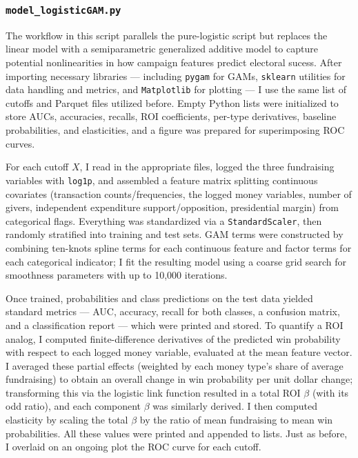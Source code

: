 \subsubsection*{\tt model\_logisticGAM.py}

The workflow in this script parallels the pure-logistic script but replaces the linear model with a semiparametric generalized additive model to capture potential nonlinearities in how campaign features predict electoral sucess. After importing necessary libraries --- including {\tt pygam} for GAMs, {\tt sklearn} utilities for data handling and metrics, and {\tt Matplotlib} for plotting --- I use the same list of cutoffs and Parquet files utilized before. Empty Python lists were initialized to store AUCs, accuracies, recalls, ROI coefficients, per-type derivatives, baseline probabilities, and elasticities, and a figure was prepared for superimposing ROC curves.

For each cutoff $X$, I read in the appropriate files, logged the three fundraising variables with {\tt log1p}, and assembled a feature matrix splitting continuous covariates (transaction counts/frequencies, the logged money variables, number of givers, independent expenditure support/opposition, presidential margin) from categorical flags. Everything was standardized via a {\tt StandardScaler}, then randomly stratified into training and test sets. GAM terms were constructed by combining ten-knots spline terms for each continuous feature and factor terms for each categorical indicator; I fit the resulting model using a coarse grid search for smoothness parameters with up to 10,000 iterations.

Once trained, probabilities and class predictions on the test data yielded standard metrics --- AUC, accuracy, recall for both classes, a confusion matrix, and a classification report --- which were printed and stored. To quantify a ROI analog, I computed finite-difference derivatives of the predicted win probability with respect to each logged money variable, evaluated at the mean feature vector. I averaged these partial effects (weighted by each money type's share of average fundraising) to obtain an overall change in win probability per unit dollar change; transforming this via the logistic link function resulted in a total ROI $\beta$ (with its odd ratio), and each component $\beta$ was similarly derived. I then computed elasticity by scaling the total $\beta$ by the ratio of mean fundraising to mean win probabilities. All these values were printed and appended to lists. Just as before, I overlaid on an ongoing plot the ROC curve for each cutoff.

